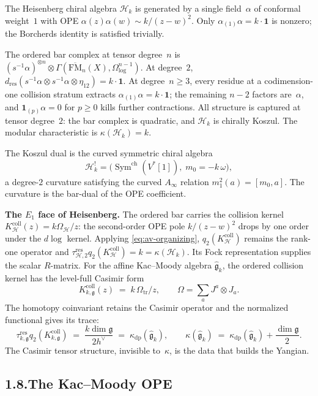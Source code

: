 \documentclass[11pt]{report}
\theoremstyle{definition}
\theoremstyle{remark}
\numberwithin{equation}{section}
\begin{document}
The Heisenberg chiral algebra $\mathcal H_k$ is generated by a single
field~$\alpha$ of conformal weight~$1$ with OPE
$\alpha(z)\alpha(w)\sim k/(z-w)^2$. Only $\alpha_{(1)}\alpha=k\cdot\mathbf 1$
is nonzero; the Borcherds identity is satisfied trivially.

The ordered bar complex at tensor degree~$n$ is
$(s^{-1}\alpha)^{\otimes n}\otimes\Gamma(\overline{\mathrm{FM}}_n(X),\Omega^{n-1}_{\log})$.
At degree~$2$, $d_{\mathrm{res}}(s^{-1}\alpha\otimes s^{-1}\alpha\otimes\eta_{12})=k\cdot\mathbf 1$.
At degree~$n\ge 3$, every residue at a codimension-one collision
stratum extracts $\alpha_{(1)}\alpha=k\cdot\mathbf 1$; the remaining
$n-2$ factors are~$\alpha$, and $\mathbf 1_{(p)}\alpha=0$ for $p\ge 0$
kills further contractions. All structure is captured at tensor
degree~$2$: the bar complex is quadratic, and $\mathcal H_k$ is
chirally Koszul. The modular characteristic is $\kappa(\mathcal H_k)=k$.

The Koszul dual is the curved symmetric chiral algebra
\[
\mathcal H_k^!=\bigl(\operatorname{Sym}^{\mathrm{ch}}(V^*[1]),\;m_0=-k\,\omega\bigr),
\]
a degree-$2$ curvature satisfying the curved $A_\infty$ relation
$m_1^2(a)=[m_0,a]$. The curvature is the bar-dual of the OPE coefficient.

\medskip
\noindent\textbf{The $E_1$ face of Heisenberg.}\enspace
The ordered bar carries the collision kernel
$K_{\mathcal H}^{\mathrm{coll}}(z)=k\Omega_{\mathcal H}/z$: the second-order OPE pole
$k/(z-w)^2$ drops by one order under the $d\log$ kernel. Applying \eqref{eq:av-organizing},
$q_2(K_{\mathcal H}^{\mathrm{coll}})$ remains the rank-one operator
and $\tau_{\mathcal H,2}^{\mathrm{res}}
q_2(K_{\mathcal H}^{\mathrm{coll}})=k=\kappa(\mathcal H_k)$.
Its Fock representation supplies the scalar $R$-matrix. For the
affine Kac--Moody algebra $\widehat{\mathfrak g}_k$, the ordered
collision kernel has the level-full Casimir form
\[
K_{k,\mathfrak g}^{\mathrm{coll}}(z)
\;=\;k\,\Omega_{\mathrm{tr}}/z,\qquad
\Omega=\sum_a J^a\otimes J_a.
\]
The homotopy coinvariant retains the Casimir operator and the
normalized functional gives its trace:
\[
\tau_{k,\mathfrak g}^{\mathrm{res}}
q_2(K_{k,\mathfrak g}^{\mathrm{coll}})
\;=\;\frac{k\dim\mathfrak g}{2h^\vee}
\;=\;\kappa_{\mathrm{dp}}(\widehat{\mathfrak g}_k),
\qquad
\kappa(\widehat{\mathfrak g}_k)\;=\;\kappa_{\mathrm{dp}}(\widehat{\mathfrak g}_k)+\frac{\dim\mathfrak g}{2}.
\]
The Casimir tensor structure, invisible to~$\kappa$, is the data
that builds the Yangian.

\subsection*{1.8.\enspace The Kac--Moody OPE}
\end{document}
